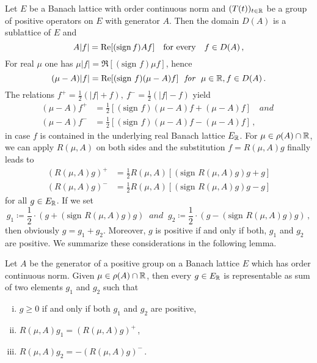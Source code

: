 Let $E$ be a Banach lattice with order continuous norm and $(T(t))_{t \in \R }$
be a group of positive operators on $E$ with generator $A$.
Then the domain $D(A)$ is a sublattice of $E$ and
\begin{equation}\label{eq:c3-4.8}
	A|f| = \Re [(\text{sign\,} f)Af] \quad \text{for every} \quad f \in D(A)\,,
\end{equation}
For real $\mu$ one has $\mu|f| = \Re [(\text{sign } f)\mu f]$, hence
\[
(\mu - A)|f| = \Re[(\text{sign } f)(\mu - A)f] \ \textit{ for } \ \mu \in \R , f \in D(A)\,.
\]
The relations $f^+ = \frac{1}{2}(|f| + f), \ f^- = \frac{1}{2}(|f| - f)$ yield
\begin{align*}
(\mu - A)f^+ &= \frac{1}{2}[(\text{sign } f)(\mu - A)f + (\mu - A)f] \quad\textit{and }\\
(\mu - A)f^- &= \frac{1}{2}[(\text{sign } f)(\mu - A)f - (\mu - A)f]\,,
\end{align*}
in case $f$ is contained in the underlying real Banach lattice $E_{\R }$.
For $\mu \in \rho(A) \cap \R $, we can apply $R(\mu,A)$ on both sides and the substitution $f = R(\mu,A)g$ finally leads to
\begin{equation}\label{eq:c3-4.9}
	\begin{aligned}
	(R(\mu,A)g)^+ &= \frac{1}{2}R(\mu,A) [(\text{sign } R(\mu,A)g)g + g] \\
	(R(\mu,A)g)^- &= \frac{1}{2}R(\mu,A) [(\text{sign } R(\mu,A)g)g - g]
	\end{aligned}
\end{equation}
for all $g \in E_{\R }$. If we set 
\[ 
g_1 \coloneqq \frac{1}{2}\cdot(g + (\text{sign } R(\mu,A)g)g) \ \textit{ and } \ 
g_2 \coloneqq \frac{1}{2}\cdot(g - (\text{sign } R(\mu,A)g)g)\,,
\]
then obviously $g = g_1 + g_2$. Moreover, $g$ is positive if and only if
both, $g_1$ and $g_2$ are positive. We summarize these considerations in
the following lemma.
%
%
\begin{lemma}\label{lem:c3-4.6}
Let $A$ be the generator of a positive group on a Banach
lattice $E$ which has order continuous norm. Given $\mu \in \rho(A) \cap \R $, then
every $g \in E_{\R }$ is representable as sum of two elements $g_1$ and $g_2$
such that
\begin{enumerate}[(i)]
	\item 
	$g \geq 0$ if and only if both $g_1$ and $g_2$ are positive,
	
	\item
	$R(\mu,A)g_1 = (R(\mu,A)g)^+$\,,

	\item
	$R(\mu,A)g_2 = -(R(\mu,A)g)^-$\,.
\end{enumerate}	
\end{lemma}

